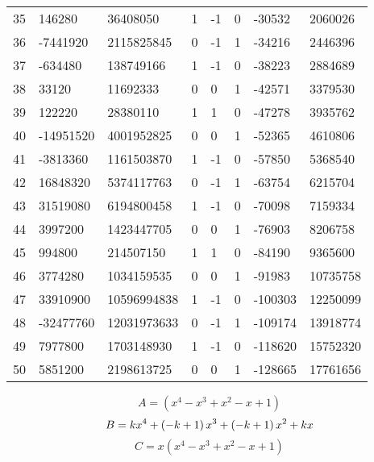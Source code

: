 \documentclass{amsart}
\begin{document}
\begin{longtable}{|l|l|l|lllll|}
35&146280&36408050&1&-1&0&-30532&2060026\\
36&-7441920&2115825845&0&-1&1&-34216&2446396\\
37&-634480&138749166&1&-1&0&-38223&2884689\\
38&33120&11692333&0&0&1&-42571&3379530\\
39&122220&28380110&1&1&0&-47278&3935762\\
40&-14951520&4001952825&0&0&1&-52365&4610806\\
41&-3813360&1161503870&1&-1&0&-57850&5368540\\
42&16848320&5374117763&0&-1&1&-63754&6215704\\
43&31519080&6194800458&1&-1&0&-70098&7159334\\
44&3997200&1423447705&0&0&1&-76903&8206758\\
45&994800&214507150&1&1&0&-84190&9365600\\
46&3774280&1034159535&0&0&1&-91983&10735758\\
47&33910900&10596994838&1&-1&0&-100303&12250099\\
48&-32477760&12031973633&0&-1&1&-109174&13918774\\
49&7977800&1703148930&1&-1&0&-118620&15752320\\
50&5851200&2198613725&0&0&1&-128665&17761656\\
\hline
\end{longtable}
$$A=(x^4
 - x^3
 + x^2
 - x
 + 1)$$
$$B=k\*x^4
 + \left(-k
 + 1\right) \*x^3
 + \left(-k
 + 1\right) \*x^2
 + k\*x$$
$$C=x(x^4
 - x^3
 + x^2
 - x
 + 1)$$
\end{document}

